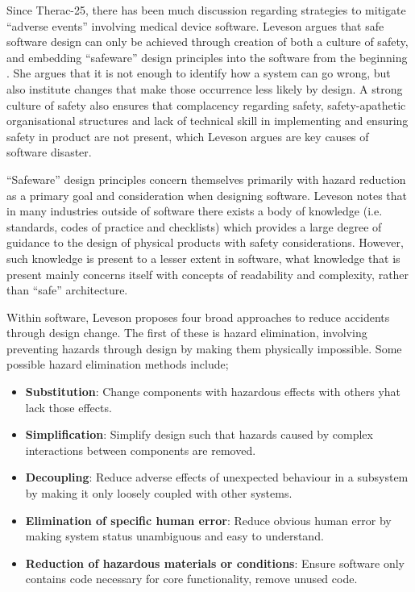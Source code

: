 \documentclass{cshonours}
\newcommand{\ther}{Therac-25\xspace}
\begin{document}
Since \ther, there has been much discussion regarding strategies to mitigate ``adverse events'' involving medical device software. Leveson argues that safe software design can only be achieved through creation of both a culture of safety, \cite[ch.~4]{safeware} and embedding ``safeware'' design principles into the software from the beginning \cite[ch.~16]{safeware}. She argues that it is not enough to identify how a system can go wrong, but also institute changes that make those occurrence less likely by design. A strong culture of safety also ensures that complacency regarding safety, safety-apathetic organisational structures and lack of technical skill in implementing and ensuring safety in product are not present, which Leveson argues are key causes of software disaster.

``Safeware'' design principles concern themselves primarily with hazard reduction as a primary goal and consideration when designing software. Leveson notes that in many industries outside of software there exists a body of knowledge (i.e. standards, codes of practice and checklists) which provides a large degree of guidance to the design of physical products with safety considerations. However, such knowledge is present to a lesser extent in software, what knowledge that is present mainly concerns itself with concepts of readability and complexity, rather than ``safe'' architecture.

Within software, Leveson proposes four broad approaches to reduce accidents through design change. The first of these is hazard elimination, involving preventing hazards through design by making them physically impossible. Some possible hazard elimination methods include;
 \begin{itemize}
  \item \textbf{Substitution}: Change components with hazardous effects with others yhat lack those effects.
  \item \textbf{Simplification}: Simplify design such that hazards caused by complex interactions between components are removed.
  \item \textbf{Decoupling}: Reduce adverse effects of unexpected behaviour in a subsystem by making it only loosely coupled with other systems.
  \item \textbf{Elimination of specific human error}: Reduce obvious human error by making system status unambiguous and easy to understand.
  \item \textbf{Reduction of hazardous materials or conditions}: Ensure software only contains code necessary for core functionality, remove unused code.
 \end{itemize}
 
\end{document}
